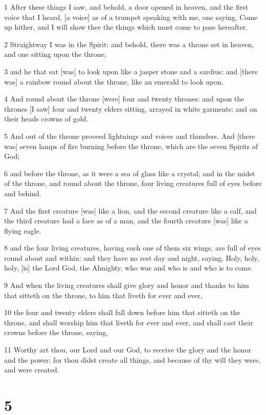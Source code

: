 \par 1 After these things I saw, and behold, a door opened in heaven, and the first voice that I heard, [a voice] as of a trumpet speaking with me, one saying, Come up hither, and I will show thee the things which must come to pass hereafter.
\par 2 Straightway I was in the Spirit: and behold, there was a throne set in heaven, and one sitting upon the throne;
\par 3 and he that sat [was] to look upon like a jasper stone and a sardius: and [there was] a rainbow round about the throne, like an emerald to look upon.
\par 4 And round about the throne [were] four and twenty thrones: and upon the thrones [I saw] four and twenty elders sitting, arrayed in white garments; and on their heads crowns of gold.
\par 5 And out of the throne proceed lightnings and voices and thunders. And [there was] seven lamps of fire burning before the throne, which are the seven Spirits of God;
\par 6 and before the throne, as it were a sea of glass like a crystal; and in the midst of the throne, and round about the throne, four living creatures full of eyes before and behind.
\par 7 And the first creature [was] like a lion, and the second creature like a calf, and the third creature had a face as of a man, and the fourth creature [was] like a flying eagle.
\par 8 and the four living creatures, having each one of them six wings, are full of eyes round about and within: and they have no rest day and night, saying, Holy, holy, holy, [is] the Lord God, the Almighty, who was and who is and who is to come.
\par 9 And when the living creatures shall give glory and honor and thanks to him that sitteth on the throne, to him that liveth for ever and ever,
\par 10 the four and twenty elders shall fall down before him that sitteth on the throne, and shall worship him that liveth for ever and ever, and shall cast their crowns before the throne, saying,
\par 11 Worthy art thou, our Lord and our God, to receive the glory and the honor and the power: for thou didst create all things, and because of thy will they were, and were created.

\chapter{5}

